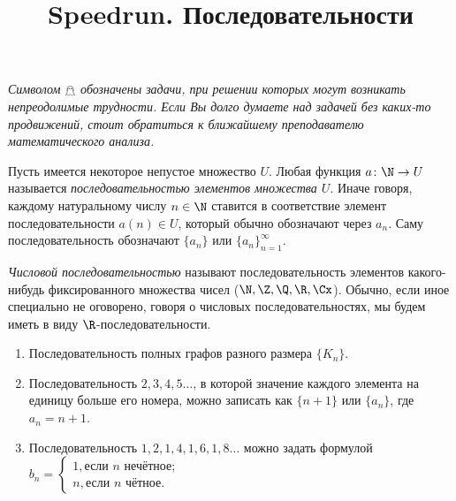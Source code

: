 \documentclass[a4paper, 12pt, num=2426, date=01.09.2020]{listok}
\begin{document}
\makeatletter{}
\renewcommand{\listok@num}{\faCar}%
\makeatother{}

\title{Speedrun. Последовательности}
\maketitle{}

\setlength{\abovedisplayskip}{5pt plus 2pt minus 2pt}
\setlength{\belowdisplayskip}{5pt plus 2pt minus 2pt}

\begin{center}
    \textit{Символом $\mathghost$ обозначены задачи, при решении которых могут возникать непреодолимые трудности.
    Если Вы долго думаете над задачей без каких-то продвижений, стоит обратиться к ближайшему преподавателю математического анализа.}
\end{center}

\begin{definition}
    Пусть имеется некоторое непустое множество $U$.
    Любая функция $a \colon \N \to U$ называется \textit{последовательностью элементов множества $U$}.
    Иначе говоря, каждому натуральному числу $n \in \N$ ставится в соответствие элемент последовательности $a(n) \in U$, который обычно обозначают через $a_n$.
    Саму последовательность обозначают $\{a_n\}$ или ${\{a_n\}}_{n = 1}^{\infty}$.
\end{definition}

\begin{definition}
    \textit{Числовой последовательностью} называют последовательность элементов какого-нибудь фиксированного множества чисел ($\N, \Z, \Q, \R, \Cx$).
    Обычно, если иное специально не оговорено, говоря о числовых последовательностях, мы будем иметь в виду $\R$-последовательности.
\end{definition}

\begin{example*}
    \begin{enumerate}
        \item Последовательность полных графов разного размера $\{K_n\}$.
        \item Последовательность $2, 3, 4, 5\ldots$, в которой значение каждого элемента на единицу больше его номера,
            можно записать как $\{n + 1\}$ или $\{a_n\}$, где $a_n = n + 1$.
        \item Последовательность $1, 2, 1, 4, 1, 6, 1, 8\ldots$ можно задать формулой
            $b_n = \begin{cases} 1, \text{если $n$ нечётное;}\\ n, \text{если $n$ чётное.} \end{cases}$
    \end{enumerate}
\end{example*}
\end{document}
